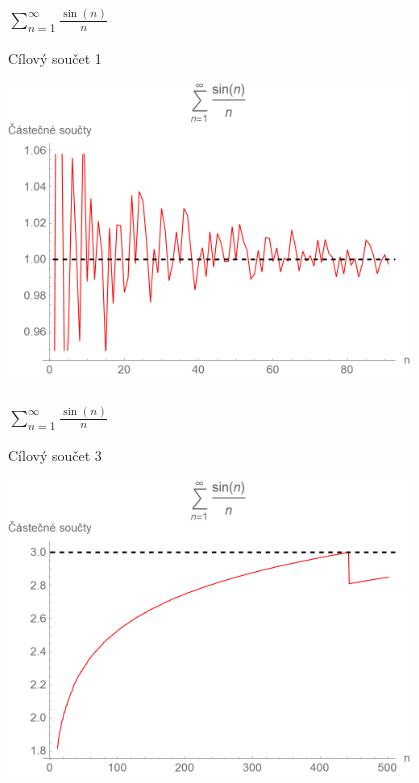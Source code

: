 \documentclass{beamer}
\begin{document}
\begin{frame}
  \frametitle{\(\sum _{n=1} ^{\infty} \frac{\sin(n)}{n}\)}
  Cílový součet 1
  \begin{center}
    \includegraphics[width=0.8\textwidth]{serie3_1.png}
  \end{center}
\end{frame}

\begin{frame}
  \frametitle{\(\sum _{n=1} ^{\infty} \frac{\sin(n)}{n}\)}
  Cílový součet 3
  \begin{center}
    \includegraphics[width=0.8\textwidth]{serie3_2.png}
  \end{center}
\end{frame}
\end{document}
